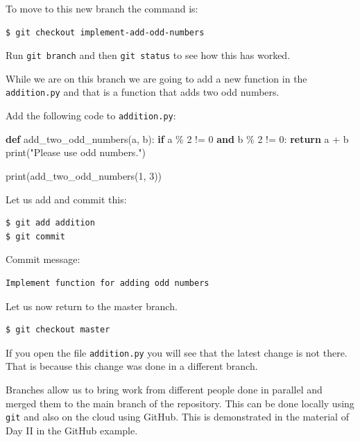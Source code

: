 \documentclass[11pt]{article}
\newenvironment{Shaded}{}{}
\newcommand{\KeywordTok}[1]{\textcolor[rgb]{0.00,0.44,0.13}{\textbf{{#1}}}}
\newcommand{\DecValTok}[1]{\textcolor[rgb]{0.25,0.63,0.44}{{#1}}}
\newcommand{\StringTok}[1]{\textcolor[rgb]{0.25,0.44,0.63}{{#1}}}
\newcommand{\NormalTok}[1]{{#1}}
\newcommand{\ControlFlowTok}[1]{\textcolor[rgb]{0.00,0.44,0.13}{\textbf{{#1}}}}
\newcommand{\OperatorTok}[1]{\textcolor[rgb]{0.40,0.40,0.40}{{#1}}}
\newcommand{\BuiltInTok}[1]{{#1}}
\begin{document}
To move to this new branch the command is:

\begin{verbatim}
$ git checkout implement-add-odd-numbers
\end{verbatim}

Run \texttt{git\ branch} and then \texttt{git\ status} to see how this
has worked.

    While we are on this branch we are going to add a new function in the
\texttt{addition.py} and that is a function that adds two odd numbers.

Add the following code to \texttt{addition.py}:

\begin{Shaded}
\begin{Highlighting}[]
\KeywordTok{def}\NormalTok{ add\_two\_odd\_numbers(a, b):}
    \ControlFlowTok{if}\NormalTok{ a }\OperatorTok{\%} \DecValTok{2} \OperatorTok{!=} \DecValTok{0} \KeywordTok{and}\NormalTok{ b }\OperatorTok{\%} \DecValTok{2} \OperatorTok{!=} \DecValTok{0}\NormalTok{:}
        \ControlFlowTok{return}\NormalTok{ a }\OperatorTok{+}\NormalTok{ b}
    \BuiltInTok{print}\NormalTok{(}\StringTok{"Please use odd numbers."}\NormalTok{)}

\BuiltInTok{print}\NormalTok{(add\_two\_odd\_numbers(}\DecValTok{1}\NormalTok{, }\DecValTok{3}\NormalTok{))}
\end{Highlighting}
\end{Shaded}

    Let us add and commit this:

\begin{verbatim}
$ git add addition
$ git commit 
\end{verbatim}

Commit message:

\begin{verbatim}
Implement function for adding odd numbers
\end{verbatim}

    Let us now return to the master branch.

\begin{verbatim}
$ git checkout master
\end{verbatim}

If you open the file \texttt{addition.py} you will see that the latest
change is not there. That is because this change was done in a different
branch.

Branches allow us to bring work from different people done in parallel
and merged them to the main branch of the repository. This can be done
locally using \texttt{git} and also on the cloud using GitHub. This is
demonstrated in the material of Day II in the GitHub example.
\end{document}
